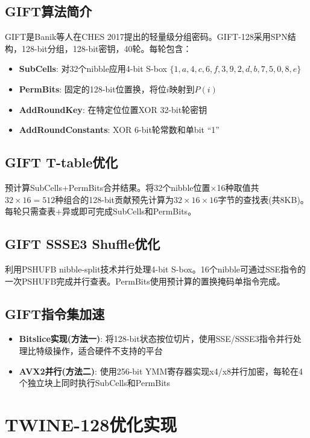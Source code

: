 \documentclass[12pt,a4paper]{ctexart}
\begin{document}
\subsection{GIFT算法简介}
GIFT是Banik等人在CHES 2017提出的轻量级分组密码。GIFT-128采用SPN结构，128-bit分组，128-bit密钥，40轮。每轮包含：
\begin{itemize}[itemsep=2pt]
\item \textbf{SubCells}: 对32个nibble应用4-bit S-box $\{1,a,4,c,6,f,3,9,2,d,b,7,5,0,8,e\}$
\item \textbf{PermBits}: 固定的128-bit位置换，将位$i$映射到$P(i)$
\item \textbf{AddRoundKey}: 在特定位位置XOR 32-bit轮密钥
\item \textbf{AddRoundConstants}: XOR 6-bit轮常数和单bit ``1''
\end{itemize}

\subsection{GIFT T-table优化}
预计算SubCells+PermBits合并结果。将32个nibble位置$\times$16种取值共$32\times16=512$种组合的128-bit贡献预先计算为$32\times16\times16$字节的查找表(共8KB)。每轮只需查表+异或即可完成SubCells和PermBits。

\subsection{GIFT SSSE3 Shuffle优化}
利用PSHUFB nibble-split技术并行处理4-bit S-box。16个nibble可通过SSE指令的一次PSHUFB完成并行查表。PermBits使用预计算的置换掩码单指令完成。

\subsection{GIFT指令集加速}
\begin{itemize}[itemsep=2pt]
\item \textbf{Bitslice实现(方法一)}: 将128-bit状态按位切片，使用SSE/SSSE3指令并行处理比特级操作，适合硬件不支持的平台
\item \textbf{AVX2并行(方法二)}: 使用256-bit YMM寄存器实现x4/x8并行加密，每轮在4个独立块上同时执行SubCells和PermBits
\end{itemize}

\newpage
\section{TWINE-128优化实现}
\end{document}
